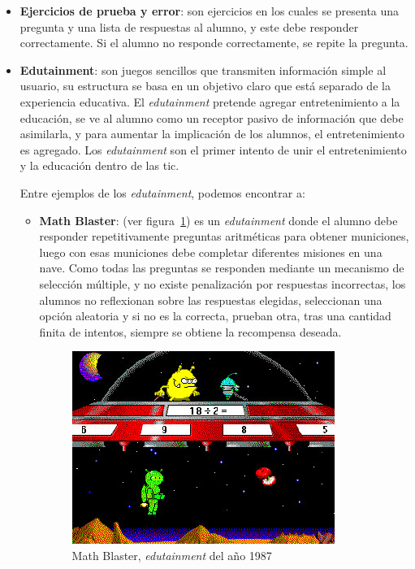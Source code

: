 \begin{itemize}

\item \textbf{Ejercicios de prueba y error}: son ejercicios en los cuales se
    presenta una pregunta y una lista de respuestas al alumno, y este debe
    responder correctamente. Si el alumno no responde correctamente, se repite
    la pregunta\cite{weegar2012comparison}.

\item \textbf{Edutainment}: son juegos sencillos que transmiten información
    simple al usuario, su estructura se basa en un objetivo claro que está
    separado de la experiencia educativa\cite{egenfeldt2007third}. El
    \emph{edutainment} pretende agregar entretenimiento a la educación, se ve al
    alumno como un receptor pasivo de información que debe asimilarla, y para
    aumentar la implicación de los alumnos, el entretenimiento es
    agregado\cite{resnick:2004}. Los \emph{edutainment} son el primer intento de
    unir el entretenimiento y la educación dentro de las
    \gls{tic}\cite{leinonen:ict}.

    Entre ejemplos de los \emph{edutainment}, podemos encontrar a:

    \begin{itemize}

    \item \textbf{Math Blaster}: (ver figura~\ref{fig:math_blaster}) es un
        \emph{edutainment} donde el alumno debe responder repetitivamente
        preguntas aritméticas para obtener municiones, luego con esas municiones
        debe completar diferentes misiones en una nave\cite{bruckman1999can}.
        Como todas las preguntas se responden mediante un mecanismo de selección
        múltiple, y no existe penalización por respuestas incorrectas, los
        alumnos no reflexionan sobre las respuestas elegidas, seleccionan una
        opción aleatoria y si no es la correcta, prueban otra, tras una cantidad
        finita de intentos, siempre se obtiene la recompensa deseada.

        \begin{figure}[H] 
        \centering 
        \includegraphics[scale=0.4]{tics/images/math_blaster.jpg}
        \caption{Math Blaster, \emph{edutainment} del año 1987}\label{fig:math_blaster} 
        \end{figure}


\end{itemize}
\end{itemize}
